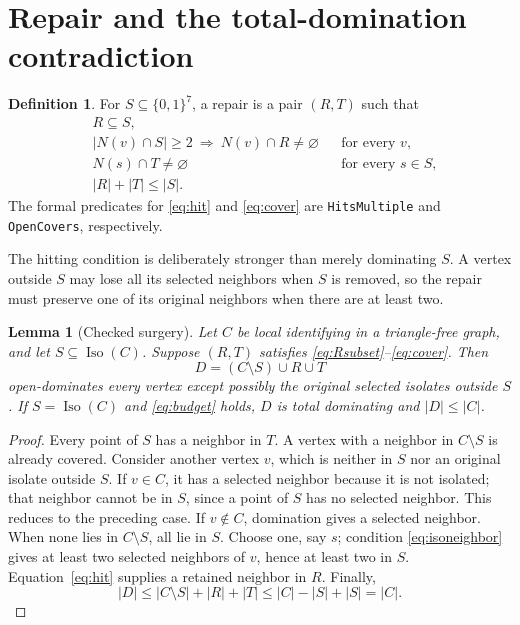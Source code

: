 \documentclass[11pt]{article}
\newtheorem{lemma}[theorem]{Lemma}
\theoremstyle{definition}\newtheorem{definition}[theorem]{Definition}
\theoremstyle{remark}\newtheorem{remark}[theorem]{Remark}
\newcommand{\iso}{\operatorname{Iso}}
\newcommand{\card}[1]{\lvert #1\rvert}
\newcommand{\src}[1]{{\small\nolinkurl{#1}}}
\newcommand{\bits}{\{0,1\}}
\begin{document}
\section{Repair and the total-domination contradiction}
\begin{definition}\label{def:repair}
For $S\subseteq\bits^7$, a repair is a pair $(R,T)$ such that
\begin{align}
 &R\subseteq S,\label{eq:Rsubset}\\
 &\card{N(v)\cap S}\ge2\ \Longrightarrow\ N(v)\cap R\ne\varnothing
       &&\text{for every }v,\label{eq:hit}\\
 &N(s)\cap T\ne\varnothing&&\text{for every }s\in S,\label{eq:cover}\\
 &\card R+\card T\le\card S.\label{eq:budget}
\end{align}
The formal predicates for \eqref{eq:hit} and \eqref{eq:cover} are
\src{HitsMultiple} and \src{OpenCovers}, respectively.
\end{definition}
The hitting condition is deliberately stronger than merely dominating $S$. A vertex outside $S$ may lose all its selected neighbors when $S$ is removed, so the repair must preserve one of its original neighbors when there are at least two.

\begin{lemma}[Checked surgery]\label{lem:surgery}
Let $C$ be local identifying in a triangle-free graph, and let $S\subseteq\iso(C)$. Suppose $(R,T)$ satisfies \eqref{eq:Rsubset}--\eqref{eq:cover}. Then
\[
 D=(C\setminus S)\cup R\cup T
\]
open-dominates every vertex except possibly the original selected isolates outside $S$. If $S=\iso(C)$ and \eqref{eq:budget} holds, $D$ is total dominating and $\card D\le\card C$.
\end{lemma}
\begin{proof}
Every point of $S$ has a neighbor in $T$. A vertex with a neighbor in $C\setminus S$ is already covered. Consider another vertex $v$, which is neither in $S$ nor an original isolate outside $S$. If $v\in C$, it has a selected neighbor because it is not isolated; that neighbor cannot be in $S$, since a point of $S$ has no selected neighbor. This reduces to the preceding case. If $v\notin C$, domination gives a selected neighbor. When none lies in $C\setminus S$, all lie in $S$. Choose one, say $s$; condition \eqref{eq:isoneighbor} gives at least two selected neighbors of $v$, hence at least two in $S$. Equation~\eqref{eq:hit} supplies a retained neighbor in $R$. Finally,
\[
 \card D\le\card{C\setminus S}+\card R+\card T
 \le\card C-\card S+\card S=\card C.
\]
\end{proof}
\end{document}
